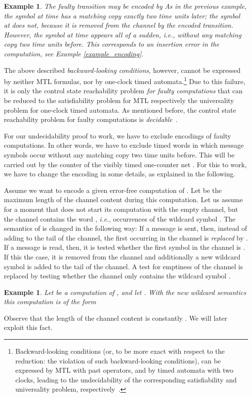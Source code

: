 \documentclass{CSML}
\theoremstyle{plain}\newtheorem{theorem}[thm]{Theorem}
\theoremstyle{plain}\newtheorem{corollary}[thm]{Corollary}
\theoremstyle{plain}\newtheorem{example}[thm]{Example}
\theoremstyle{plain}\newtheorem{lemma}[thm]{Lemma}
\theoremstyle{plain}\newtheorem{remark}[thm]{Remark}
\newcommand*\ie{\textit{i.e.}}
\begin{document}
\begin{example}
	The faulty transition  
	may be encoded by  
	As in the previous example, the symbol  at time   has a matching copy exactly two time units later; the symbol  at  does not, because it is removed from the channel by the encoded transition. 
	However, the symbol  at time  appears all of a sudden, \ie, without any matching copy two time units before.
 This corresponds to an insertion error in the computation, see Example \ref{example_encoding}. 
\end{example}
The above described \emph{backward-looking conditions}, however, cannot be expressed by neither MTL formulas, nor by one-clock timed automata.\footnote{Backward-looking conditions (or, to be more exact with respect to the reduction: the violation of such backward-looking conditions), can be expressed by MTL with past operators, and by timed automata with two clocks, leading to the undecidability of the corresponding satisfiability and universality problem, respectively~\cite{AD94}.} Due to this failure, it is only the control state reachability problem \emph{for faulty computations} that can be reduced to the satisfiability problem for MTL respectively the universality problem for one-clock timed automata. As mentioned before, the control state reachability problem for faulty computations is \emph{decidable}~\cite{DBLP:journals/fuin/AbdullaDOQW08}.

For our undecidability proof to work,
we have to exclude encodings of faulty computations. 
In other words, we have to exclude timed words in which message symbols occur without any matching copy two time units before. 
This will be carried out by the counter of the visibly timed one-counter net . 
For this to work, we have to change the encoding in some details, as explained in the following. 







Assume we want to encode a given error-free computation of . 
Let  be the maximum length of the channel content during this computation. 
Let us assume for a moment that  does not start its computation with the empty channel, but the channel contains the word , \ie,  occurrences of the wildcard symbol . The semantics of  is changed in the following way: If a message  is sent, then, instead of adding  to the tail of the channel, the first  occurring in the channel is \emph{replaced} by . 
If a message  is read, then, it is tested whether the first symbol in the channel is . If this the case, it is removed from the channel and additionally a new wildcard symbol   is added to the tail of the channel. 
A test for emptiness of the channel is replaced by testing whether the channel only contains the wildcard symbol . 
\begin{example}
	Let  be a computation of , and let . 
	With the new wildcard semantics this computation is of the form
	
\end{example}
Observe that the length of the channel content is constantly . 
We will later exploit this fact. 
\end{document}
